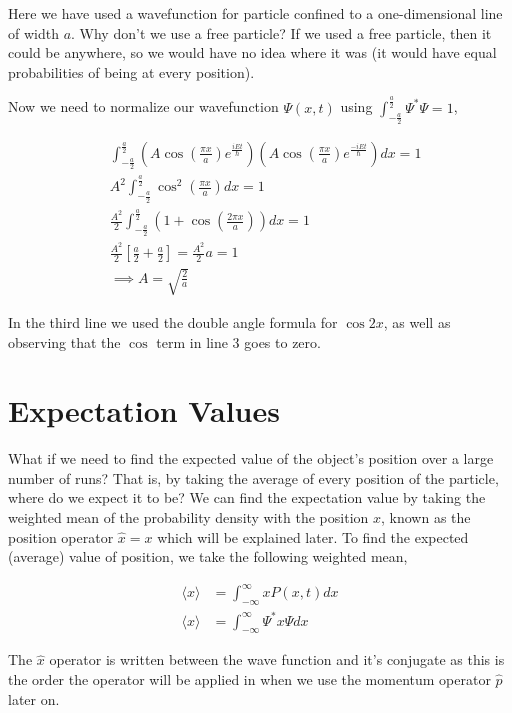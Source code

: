 \documentclass[11pt]{amsart}
\begin{document}
Here we have used a wavefunction for particle confined to a one-dimensional line of width $a$. Why don't we use a free particle? If we used a free particle, then it could be anywhere, so we would have no idea where it was (it would have equal probabilities of being at every position).

Now we need to normalize our wavefunction $\Psi(x, t)$ using $\int_{-\frac{a}{2}}^{\frac{a}{2}} \Psi^* \Psi = 1$,

\begin{align*}
  &\int_{-\frac{a}{2}}^{\frac{a}{2}} \left(A\cos{\left(\frac{\pi x}{a}\right)} e^{\frac{iEt}{\hbar}}\right)\left(A\cos{\left(\frac{\pi x}{a}\right)} e^{\frac{-iEt}{\hbar}}\right) dx = 1 \\
  &A^2 \int_{-\frac{a}{2}}^{\frac{a}{2}} \cos^2{\left(\frac{\pi x}{a}\right)} dx = 1 \\
  &\frac{A^2}{2} \int_{-\frac{a}{2}}^{\frac{a}{2}} \left(1 + \cos{\left(\frac{2\pi x}{a}\right)}\right) dx = 1 \\
  &\frac{A^2}{2} \left[\frac{a}{2} + \frac{a}{2}\right] = \frac{A^2}{2} a = 1 \\
  &\implies A = \sqrt{\frac{2}{a}}
\end{align*}

In the third line we used the double angle formula for $\cos 2x$, as well as observing that the $\cos$ term in line 3 goes to zero.

\section{Expectation Values}

What if we need to find the expected value of the object's position over a large number of runs? That is, by taking the average of every position of the particle, where do we expect it to be? We can find the expectation value by taking the weighted mean of the probability density with the position $x$, known as the position operator $\hat{x} = x$ which will be explained later. To find the expected (average) value of position, we take the following weighted mean,

\begin{align*}
  \langle x\rangle &= \int_{-\infty}^{\infty} x P(x, t) dx \\
  \langle x\rangle &= \int_{-\infty}^{\infty} \Psi^* x \Psi dx
\end{align*}

The $\hat{x}$ operator is written between the wave function and it's conjugate as this is the order the operator will be applied in when we use the momentum operator $\hat{p}$ later on.
\end{document}
